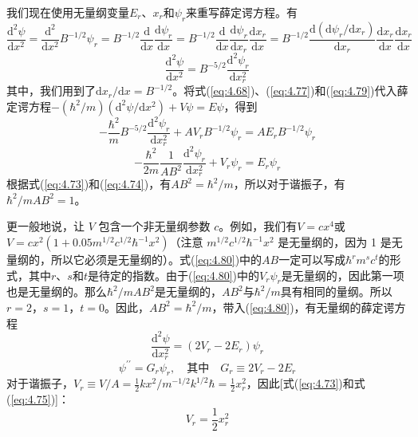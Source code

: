     我们现在使用无量纲变量$E_r$、$x_r$和$\psi_r$来重写薛定谔方程。有
    \begin{equation*}
        \frac{\mathrm{d}^2\psi}{\mathrm{d}x^2} = \frac{\mathrm{d}^2}{\mathrm{d}x^2}B^{-1/2}\psi_r = B^{-1/2}\frac{\mathrm{d}}{\mathrm{d}x}\frac{\mathrm{d}\psi_r}{\mathrm{d}x} = B^{-1/2}\frac{\mathrm{d}}{\mathrm{d}x}\frac{\mathrm{d}\psi_r}{\mathrm{d}x_r}\frac{\mathrm{d}x_r}{\mathrm{d}x} = B^{-1/2}\frac{\mathrm{d}\left(\mathrm{d}\psi_r/\mathrm{d}x_r\right)}{\mathrm{d}x_r}\frac{\mathrm{d}x_r}{\mathrm{d}x}\frac{\mathrm{d}x_r}{\mathrm{d}x}
    \end{equation*}
    \begin{equation}
        \frac{\mathrm{d}^2\psi}{\mathrm{d}x^2} = B^{-5/2}\frac{\mathrm{d}^2\psi_r}{\mathrm{d}x_r^2}
        \label{eq:4.79}
    \end{equation}
    其中，我们用到了$\mathrm{d}x_r/\mathrm{d}x = B^{-1/2}$。将式(\ref{eq:4.68})、(\ref{eq:4.77})和(\ref{eq:4.79})代入薛定谔方程$-\left(\hbar^2/m\right)\left(\mathrm{d}^2\psi/\mathrm{d}x^2\right) + V\psi = E\psi$，得到
    \begin{equation*}
        -\frac{\hbar^2}{m}B^{-5/2}\frac{\mathrm{d}^2\psi_r}{\mathrm{d}x_r^2} + AV_rB^{-1/2}\psi_r = AE_rB^{-1/2}\psi_r
    \end{equation*}
    \begin{equation}
        -\frac{\hbar^2}{2m}\frac{1}{AB^2}\frac{\mathrm{d}^2\psi_r}{\mathrm{d}x_r^2} + V_r\psi_r = E_r\psi_r
        \label{eq:4.80}
    \end{equation}
    根据式(\ref{eq:4.73})和(\ref{eq:4.74})，有$AB^2 = \hbar^2/m$，所以对于谐振子，有$\hbar^2/mAB^2 = 1$。

    更一般地说，让 $V$ 包含一个非无量纲参数 $c$。例如，我们有$V = cx^4$或$V = cx^2\left(1+0.05m^{1/2}c^{1/2}\hbar^{-1}x^2\right)$（注意 $m^{1/2}c^{1/2}\hbar^{-1}x^2$ 是无量纲的，因为 1 是无量纲的，所以它必须是无量纲的）。式(\ref{eq:4.80})中的$AB$一定可以写成$\hbar^rm^sc^t$的形式，其中$r$、$s$和$t$是待定的指数。由于(\ref{eq:4.80})中的$V_r\psi_r$是无量纲的，因此第一项也是无量纲的。那么$\hbar^2/mAB^2$是无量纲的，$AB^2$与$\hbar^2/m$具有相同的量纲。所以$r=2$，$s=1$，$t=0$。因此，$AB^2 = \hbar^2/m$，带入(\ref{eq:4.80})，有无量纲的薛定谔方程
    \begin{equation}
        \frac{\mathrm{d}^2\psi}{\mathrm{d}x_r^2} = \left(2V_r-2E_r\right)\psi_r
        \label{eq:4.81}
    \end{equation}
    \begin{equation}
        \psi^{\prime\prime} = G_r\psi_r, \quad \text{其中} \quad G_r \equiv 2V_r-2E_r
        \label{eq:4.82}
    \end{equation}
    对于谐振子，$V_r \equiv V/A = \frac{1}{2}kx^2/m^{-1/2}k^{1/2}\hbar = \frac{1}{2}x_r^2$，因此[式(\ref{eq:4.73})和式(\ref{eq:4.75})]：
    \begin{equation}
        V_r = \frac{1}{2}x_r^2
        \label{eq:4.83}
    \end{equation}

